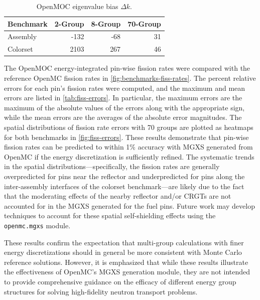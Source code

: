 \begin{table}[h!]
  \centering
  \caption{OpenMOC eigenvalue bias $\Delta k$.}
  \label{tab:keff-bias}
  \begin{tabular}{l r r r}
  \toprule
  \textbf{Benchmark} & \textbf{2-Group} & \textbf{8-Group} & \textbf{70-Group} \\
  \midrule
  Assembly & -132 & -68 & 31 \\
  \midrule
  Colorset & 2103 & 267 & 46 \\
  \bottomrule
\end{tabular}
\end{table}

The OpenMOC energy-integrated pin-wise fission rates were compared with the reference OpenMC fission rates in \cref{fig:benchmarks-fiss-rates}. The percent relative errors for each pin's fission rates were computed, and the maximum and mean errors are listed in \cref{tab:fiss-errors}. In particular, the maximum errors are the maximum of the absolute values of the errors along with the appropriate sign, while the mean errors are the averages of the absolute error magnitudes. The spatial distributions of fission rate errors with 70 groups are plotted as heatmaps for both benchmarks in \cref{fig:fiss-errors}. These results demonstrate that pin-wise fission rates can be predicted to within 1\% accuracy with MGXS generated from OpenMC if the energy discretization is sufficiently refined. The systematic trends in the spatial distributions---specifically, the fission rates are generally overpredicted for pins near the reflector and underpredicted for pins along the inter-assembly interfaces of the colorset benchmark---are likely due to the fact that the moderating effects of the nearby reflector and/or CRGTs are not accounted for in the MGXS generated for the fuel pins. Future work may develop techniques to account for these spatial self-shielding effects using the \texttt{openmc.mgxs} module.

These results confirm the expectation that multi-group calculations with finer energy discretizations should in general be more consistent with Monte Carlo reference solutions. However, it is emphasized that while these results illustrate the effectiveness of OpenMC's MGXS generation module, they are not intended to provide comprehensive guidance on the efficacy of different energy group structures for solving high-fidelity neutron transport problems.

